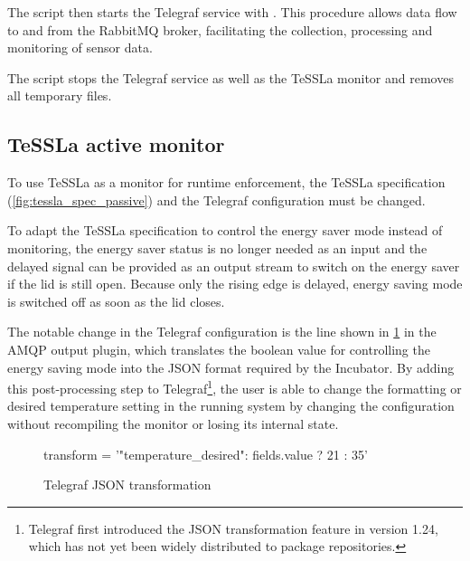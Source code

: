 %
The script then starts the Telegraf service with . This procedure allows data flow to and from the RabbitMQ broker, facilitating the collection, processing and monitoring of sensor data.

The  script stops the Telegraf service as well as the TeSSLa monitor and removes all temporary files.

\subsection{TeSSLa active monitor}\label{subsec:TESLA2}
To use TeSSLa as a monitor for runtime enforcement, the TeSSLa specification (\cref{fig:tessla_spec_passive}) and the Telegraf configuration must be changed.

To adapt the TeSSLa specification to control the energy saver mode instead of monitoring, the energy saver status is no longer needed as an input and the delayed signal can be provided as an output stream to switch on the energy saver if the lid is still open.
Because only the rising edge is delayed, energy saving mode is switched off as soon as the lid closes.

The notable change in the Telegraf configuration is the line shown in \cref{fig:telegraf_json_transformation} in the AMQP output plugin, which translates the boolean value for controlling the energy saving mode into the JSON format required by the Incubator.
By adding this post-processing step to Telegraf\footnote{
	Telegraf first introduced the JSON transformation feature in version 1.24, which has not yet been widely distributed to package repositories.
}, the user is able to change the formatting or desired temperature setting in the running system by changing the configuration without recompiling the monitor or losing its internal state.%
%
\begin{figure}[ht]
	\begin{textcode}
		transform = '{"temperature_desired": fields.value ? 21 : 35}'
	\end{textcode}
	\caption{Telegraf JSON transformation}
	\label{fig:telegraf_json_transformation}
\end{figure}%





